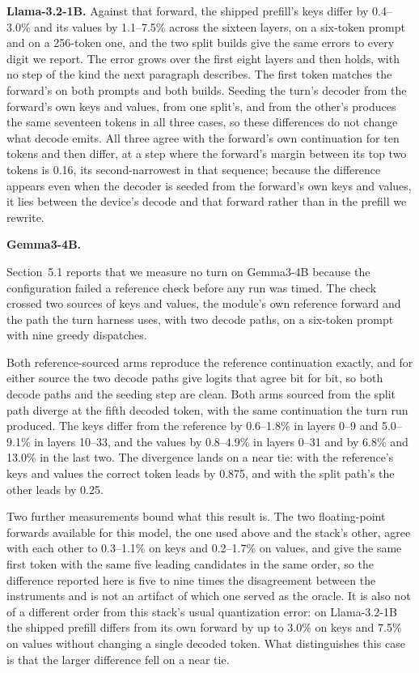 \textbf{Llama-3.2-1B.} Against that forward, the shipped prefill's keys differ by 0.4--3.0\% and its values by
1.1--7.5\% across the sixteen layers, on a six-token prompt and on a 256-token one, and the two split builds give the
same errors to every digit we report. The error grows over the first eight layers and then holds, with no step of the
kind the next paragraph describes. The first token matches the forward's on both prompts and both builds. Seeding the
turn's decoder from the forward's own keys and values, from one split's, and from the other's produces the same
seventeen tokens in all three cases, so these differences do not change what decode emits. All three agree with the
forward's own continuation for ten tokens and then differ, at a step where the forward's margin between its top two
tokens is 0.16, its second-narrowest in that sequence; because the difference appears even when the decoder is seeded
from the forward's own keys and values, it lies between the device's decode and that forward rather than in the
prefill we rewrite.

\textbf{Gemma3-4B.}

Section~5.1 reports that we measure no turn on Gemma3-4B because the configuration failed a reference check before any
run was timed. The check crossed two sources of keys and values, the module's own reference forward and the path the
turn harness uses, with two decode paths, on a six-token prompt with nine greedy dispatches.

Both reference-sourced arms reproduce the reference continuation exactly, and for either source the two decode paths
give logits that agree bit for bit, so both decode paths and the seeding step are clean. Both arms sourced from the
split path diverge at the fifth decoded token, with the same continuation the turn run produced. The keys
differ from the reference by 0.6--1.8\% in layers 0--9 and 5.0--9.1\% in layers 10--33, and the values by 0.8--4.9\% in
layers 0--31 and by 6.8\% and 13.0\% in the last two. The divergence lands on a near tie: with the reference's keys and
values the correct token leads by 0.875, and with the split path's the other leads by 0.25.

Two further measurements bound what this result is. The two floating-point forwards available for this model, the
one used above and the stack's other, agree with each other to 0.3--1.1\% on keys and 0.2--1.7\% on values, and give
the same first token with the same five leading candidates in the same order, so the difference reported here is five
to nine times the disagreement between the instruments and is not an artifact of which one served as the oracle. It
is also not of a different order from this stack's usual quantization error: on Llama-3.2-1B the shipped prefill
differs from its own forward by up to 3.0\% on keys and 7.5\% on values without changing a single decoded token. What
distinguishes this case is that the larger difference fell on a near tie.

